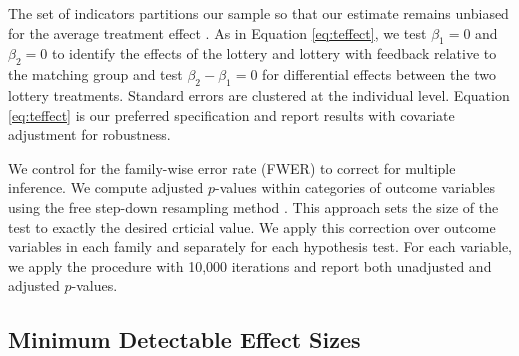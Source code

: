\documentclass[12pt]{article}
\begin{document}
		The set of indicators partitions our sample so that our estimate remains unbiased for the average treatment effect . As in Equation \ref{eq:teffect}, we test $\beta_{1} = 0$ and $\beta_{2} = 0$ to identify the effects of the lottery and lottery with feedback relative to the matching group and test $\beta_{2} - \beta_{1} = 0$ for differential effects between the two lottery treatments. Standard errors are clustered at the individual level. Equation \ref{eq:teffect} is our preferred specification and report results with covariate adjustment for robustness.



		We control for the family-wise error rate (FWER) to correct for multiple inference. We compute adjusted $p$-values within categories of outcome variables using the free step-down resampling method . This approach sets the size of the test to exactly the desired crticial value. We apply this correction over outcome variables in each family and separately for each hypothesis test. For each variable, we apply the procedure with 10,000 iterations and report both unadjusted and adjusted $p$-values.

	\subsection{Minimum Detectable Effect Sizes}
\end{document}
